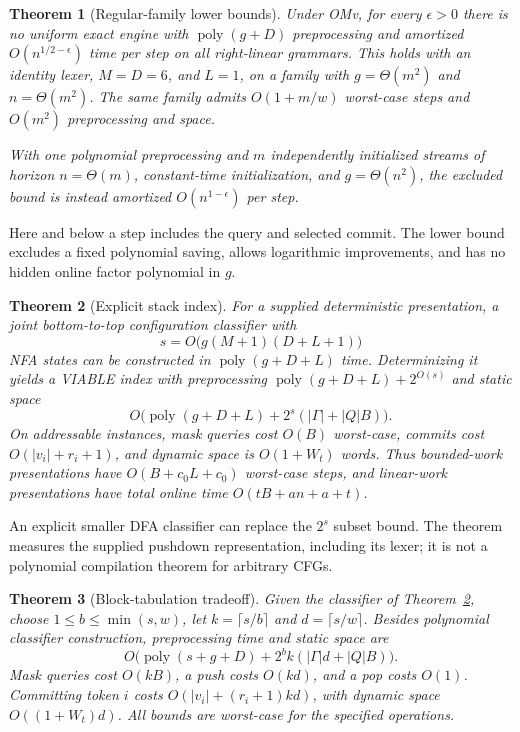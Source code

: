 \documentclass[manuscript,screen,11pt,nonacm]{acmart}
\newtheorem{theorem}{Theorem}
\theoremstyle{definition}\newtheorem{definition}{Definition}
\newcommand{\poly}{\operatorname{poly}}
\begin{document}
\begin{theorem}[Regular-family lower bounds]\label{thm:omv}
Under OMv, for every $\epsilon>0$ there is no uniform exact engine with $\poly(g+D)$ preprocessing and amortized $O(n^{1/2-\epsilon})$ time per step on all right-linear grammars. This holds with an identity lexer, $M=D=6$, and $L=1$, on a family with $g=\Theta(m^2)$ and $n=\Theta(m^2)$. The same family admits $O(1+m/w)$ worst-case steps and $O(m^2)$ preprocessing and space.

With one polynomial preprocessing and $m$ independently initialized streams of horizon $n=\Theta(m)$, constant-time initialization, and $g=\Theta(n^2)$, the excluded bound is instead amortized $O(n^{1-\epsilon})$ per step.
\end{theorem}

Here and below a step includes the query and selected commit. The lower bound excludes a fixed polynomial saving, allows logarithmic improvements, and has no hidden online factor polynomial in $g$.

\begin{theorem}[Explicit stack index]\label{thm:index}
For a supplied deterministic presentation, a joint bottom-to-top configuration classifier with
\[s=O\bigl(g(M+1)(D+L+1)\bigr)\]
NFA states can be constructed in $\poly(g+D+L)$ time. Determinizing it yields a VIABLE index with preprocessing $\poly(g+D+L)+2^{O(s)}$ and static space
\[O\bigl(\poly(g+D+L)+2^s(|\Gamma|+|Q|B)\bigr).
\]
On addressable instances, mask queries cost $O(B)$ worst-case, commits cost $O(|v_i|+r_i+1)$, and dynamic space is $O(1+W_t)$ words. Thus bounded-work presentations have $O(B+c_0L+c_0)$ worst-case steps, and linear-work presentations have total online time $O(tB+an+a+t)$.
\end{theorem}

An explicit smaller DFA classifier can replace the $2^s$ subset bound. The theorem measures the supplied pushdown representation, including its lexer; it is not a polynomial compilation theorem for arbitrary CFGs.

\begin{theorem}[Block-tabulation tradeoff]\label{thm:blocks}
Given the classifier of Theorem~\ref{thm:index}, choose $1\le b\le\min(s,w)$, let $k=\lceil s/b\rceil$ and $d=\lceil s/w\rceil$. Besides polynomial classifier construction, preprocessing time and static space are
\begin{equation}\label{eq:tradeoff}
 O\bigl(\poly(s+g+D)+2^b k(|\Gamma|d+|Q|B)\bigr).
\end{equation}
Mask queries cost $O(kB)$, a push costs $O(kd)$, and a pop costs $O(1)$. Committing token $i$ costs $O(|v_i|+(r_i+1)kd)$, with dynamic space $O((1+W_t)d)$. All bounds are worst-case for the specified operations.
\end{theorem}
\end{document}
